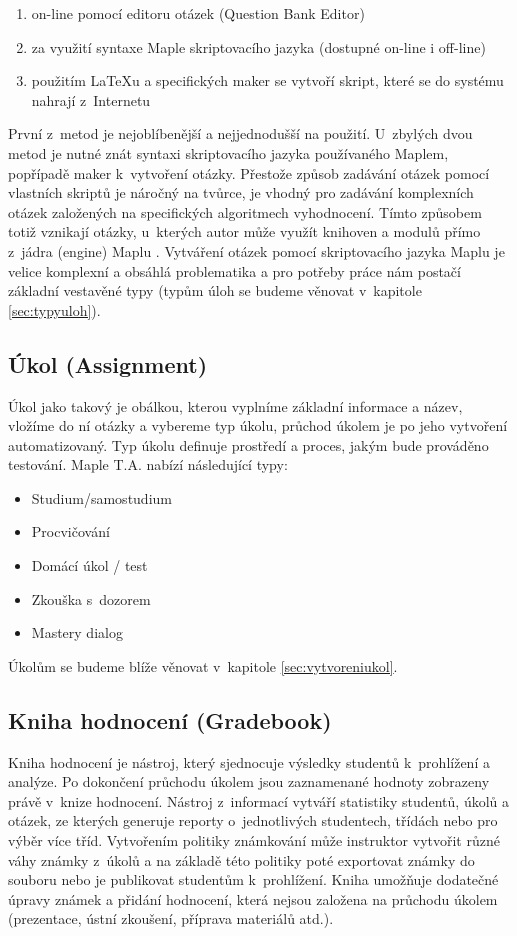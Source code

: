 \documentclass[
print,
  11pt,
  table,   
  nolof,    
  nolot,
  oneside,
  draft
]{fithesis3}
\begin{document}
\begin{enumerate}
	\item on-line pomocí editoru otázek (Question Bank Editor)
	\item za využití syntaxe Maple skriptovacího jazyka (dostupné on-line i off-line)
	\item použitím LaTeXu a specifických maker se vytvoří skript, které se do systému nahrají z~Internetu
\end{enumerate}
První z~metod je nejoblíbenější a nejjednodušší na použití. U~zbylých dvou metod je nutné znát syntaxi skriptovacího jazyka používaného Maplem, popřípadě maker k~vytvoření otázky. Přestože způsob zadávání otázek pomocí vlastních skriptů je náročný na tvůrce, je vhodný pro zadávání komplexních otázek založených na specifických algoritmech vyhodnocení. Tímto způsobem totiž vznikají otázky, u~kterých autor může využít knihoven a modulů přímo z~jádra (engine) Maplu \cite{char}. Vytváření otázek pomocí skriptovacího jazyka Maplu je velice komplexní a obsáhlá problematika a pro potřeby práce nám postačí základní vestavěné typy (typům úloh se budeme věnovat v~kapitole \ref{sec:typyuloh}). 

		\subsection{Úkol (Assignment)}
Úkol jako takový je obálkou, kterou vyplníme základní informace a název, vložíme do ní otázky a vybereme typ úkolu, průchod úkolem je po jeho vytvoření automatizovaný. Typ úkolu definuje prostředí a proces, jakým bude prováděno testování. Maple T.A. nabízí následující typy:

\begin{itemize}
	\item Studium/samostudium
	\item Procvičování
	\item Domácí úkol / test
	\item Zkouška s~dozorem 
	\item Mastery dialog
\end{itemize}
Úkolům se budeme blíže věnovat v~kapitole \ref{sec:vytvoreniukol}.

	\subsection{Kniha hodnocení (Gradebook)}
Kniha hodnocení je nástroj, který sjednocuje výsledky studentů k~prohlížení a analýze. Po dokončení průchodu úkolem jsou zaznamenané hodnoty zobrazeny právě v~knize hodnocení. Nástroj z~informací vytváří statistiky studentů, úkolů a otázek, ze kterých generuje reporty o~jednotlivých studentech, třídách nebo pro výběr více tříd. Vytvořením politiky známkování může instruktor vytvořit různé váhy známky z~úkolů a na základě této politiky poté exportovat známky do souboru nebo je publikovat studentům k~prohlížení. Kniha umožňuje dodatečné úpravy známek a přidání hodnocení, která nejsou založena na průchodu úkolem (prezentace, ústní zkoušení, příprava materiálů atd.).
\end{document}
